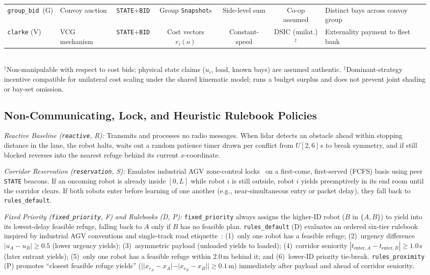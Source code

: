 \documentclass[letterpaper,journal]{IEEEtran}
\newcommand{\gb}{\texttt{group\_bid}}
\begin{document}
\begin{table}[t]
{\begin{tabular}{@{}llcccc>{\raggedright\arraybackslash}p{}@{}}
\gb\ (G) & Convoy auction & \texttt{STATE}+\texttt{BID} & Group \texttt{Snapshot}s & Side-level sum & Co-op assumed & Distinct bays across convoy group \\
\texttt{clarke} (V) & VCG mechanism & \texttt{STATE}+\texttt{BID} & Cost vectors $r_i(o)$ & Constant-speed & DSIC (unilat.)$^\ddagger$ & Externality payment to fleet bank \\\bottomrule
\end{tabular}}\\[2pt]
{\footnotesize $^\dagger$Non-manipulable with respect to cost bids; physical state claims ($u_i$, load, known bays) are assumed authentic. $^\ddagger$Dominant-strategy incentive compatible for unilateral cost scaling under the shared kinematic model; runs a budget surplus and does not prevent joint shading or bay-set omission.}
\end{table}

\subsection{Non-Communicating, Lock, and Heuristic Rulebook Policies}
\smallskip\noindent\emph{Reactive Baseline (\texttt{reactive}, R):} Transmits and processes no radio messages. When lidar detects an obstacle ahead within stopping distance in the lane, the robot halts, waits out a random patience timer drawn per conflict from $U[2,6]$\,s to break symmetry, and if still blocked reverses into the nearest refuge behind its current $x$-coordinate.

\smallskip\noindent\emph{Corridor Reservation (\texttt{reservation}, S):} Emulates industrial AGV zone-control locks~\cite{fanti2002event} on a first-come, first-served (FCFS) basis using peer \texttt{STATE} beacons. If an oncoming robot is already inside $[0,L]$ while robot $i$ is still outside, robot $i$ yields preemptively in its end room until the corridor clears. If both robots enter before learning of one another (e.g., near-simultaneous entry or packet delay), they fall back to \texttt{rules\_default}.

\smallskip\noindent\emph{Fixed Priority (\texttt{fixed\_priority}, F) and Rulebooks (D, P):} \texttt{fixed\_priority} always assigns the higher-ID robot ($B$ in $\{A,B\}$) to yield into its lowest-delay feasible refuge, falling back to $A$ only if $B$ has no feasible plan. \texttt{rules\_default} (D) evaluates an ordered six-tier rulebook inspired by industrial AGV conventions and single-track road etiquette~\cite{kato1992coordinating,highwaycode}: (1)~only one robot has a feasible refuge; (2)~urgency difference $|u_A-u_B|\ge 0.5$ (lower urgency yields); (3)~asymmetric payload (unloaded yields to loaded); (4)~corridor seniority $|t_{\mathrm{enter},A}-t_{\mathrm{enter},B}|\ge 1.0$\,s (later entrant yields); (5)~only one robot has a feasible refuge within $2.0$\,m behind it; and (6)~lower-ID priority tie-break. \texttt{rules\_proximity} (P) promotes ``closest feasible refuge yields'' ($||x_{r_A}-x_A|-|x_{r_B}-x_B||\ge 0.1$\,m) immediately after payload and ahead of corridor seniority.
\end{document}
